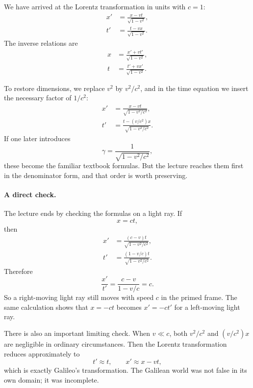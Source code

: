 We have arrived at the Lorentz transformation in units with \(c=1\):
\begin{align}
x' &= \frac{x-vt}{\sqrt{1-v^2}}, \\
t' &= \frac{t-vx}{\sqrt{1-v^2}}.
\end{align}
The inverse relations are
\begin{align}
x &= \frac{x'+vt'}{\sqrt{1-v^2}}, \\
t &= \frac{t'+vx'}{\sqrt{1-v^2}}.
\end{align}

To restore dimensions, we replace \(v^2\) by \(v^2/c^2\), and in the time equation we insert the necessary factor of \(1/c^2\):
\begin{align}
x' &= \frac{x-vt}{\sqrt{1-v^2/c^2}}, \\
t' &= \frac{t-(v/c^2)x}{\sqrt{1-v^2/c^2}}.
\end{align}
If one later introduces
\begin{equation}
\gamma=\frac{1}{\sqrt{1-v^2/c^2}},
\end{equation}
these become the familiar textbook formulas. But the lecture reaches them first in the denominator form, and that order is worth preserving.

\paragraph{A direct check.} The lecture ends by checking the formulas on a light ray. If
\begin{equation}
x=ct,
\end{equation}
then
\begin{align}
x' &= \frac{(c-v)t}{\sqrt{1-v^2/c^2}}, \\
t' &= \frac{(1-v/c)t}{\sqrt{1-v^2/c^2}}.
\end{align}
Therefore
\begin{equation}
\frac{x'}{t'}=\frac{c-v}{1-v/c}=c.
\end{equation}
So a right-moving light ray still moves with speed \(c\) in the primed frame. The same calculation shows that \(x=-ct\) becomes \(x'=-ct'\) for a left-moving light ray.

There is also an important limiting check. When \(v\ll c\), both \(v^2/c^2\) and \((v/c^2)x\) are negligible in ordinary circumstances. Then the Lorentz transformation reduces approximately to
\begin{equation}
t'\approx t,\qquad x'\approx x-vt,
\end{equation}
which is exactly Galileo's transformation. The Galilean world was not false in its own domain; it was incomplete.


